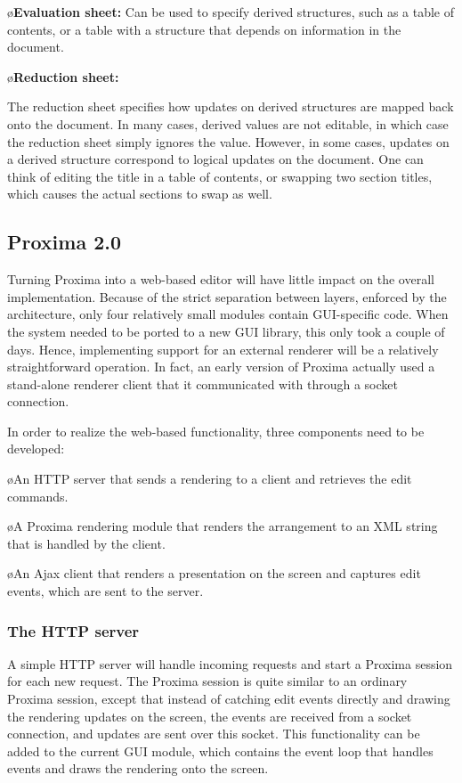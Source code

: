 \documentclass[10pt]{article}
\begin{document}
\bl
\o{\bf Evaluation sheet:}
Can be used to specify derived structures, such as a table of contents, or a table with a structure that depends on information in the document. 

\o{\bf Reduction sheet:}

The reduction sheet specifies how updates on derived structures are mapped back onto the document. In many cases, derived values are not editable, in which case the reduction sheet simply ignores the value. However, in some cases, updates on a derived structure correspond to logical updates on the document. One can think of editing the title in a table of contents, or swapping two section titles, which causes the actual sections to swap as well. 
\el


\subsection{Proxima 2.0}

Turning Proxima into a web-based editor will have little impact on the overall implementation. Because of the strict separation between layers, enforced by the architecture, only four relatively small modules contain GUI-specific code. When the system needed to be ported to a new GUI library, this only took a couple of days. Hence, implementing support for an external renderer will be a relatively straightforward operation. In fact, an early version of Proxima actually used a stand-alone renderer client that it communicated with through a socket connection.

In order to realize the web-based functionality, three components need to be developed:

\bl
\o An HTTP server that sends a rendering to a client and retrieves the edit commands. 

\o A Proxima rendering module that renders the arrangement to an XML string that is handled by the client.

\o An Ajax client that renders a presentation on the screen and captures edit events, which are sent to the server.
\el

\subsubsection{The HTTP server}

A simple HTTP server will handle incoming requests and start a Proxima session for each new request. The Proxima session is quite similar to an ordinary Proxima session, except that instead of catching edit events directly and drawing the rendering updates on the screen, the events are received from a socket connection, and updates are sent over  this socket. This functionality can be added to the current GUI module, which contains the event loop that handles events and draws the rendering onto the screen. 
 
\end{document}

